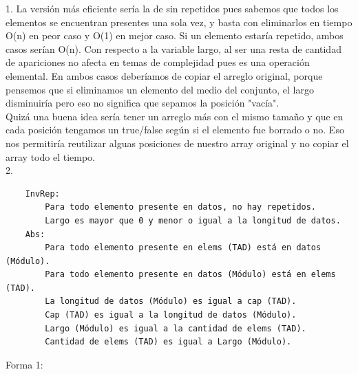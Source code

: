 \documentclass[10pt,a4paper]{article}
\begin{document}
1. La versión más eficiente sería la de sin repetidos pues sabemos que todos los elementos se encuentran presentes una sola vez, y basta con eliminarlos en tiempo O(n) en peor caso y O(1) en mejor caso. Si un elemento estaría repetido, ambos casos serían O(n). Con respecto a la variable largo, al ser una resta de cantidad de apariciones no afecta en temas de complejidad pues es una operación elemental. En ambos casos deberíamos de copiar el arreglo original, porque pensemos que si eliminamos un elemento del medio del conjunto, el largo disminuiría pero eso no significa que sepamos la posición "vacía". \\
Quizá una buena idea sería tener un arreglo más con el mismo tamaño y que en cada posición tengamos un true/false según si el elemento fue borrado o no. Eso nos permitiría reutilizar alguas posiciones de nuestro array original y no copiar el array todo el tiempo. \\
2.
\begin{lstlisting}
    InvRep: 
        Para todo elemento presente en datos, no hay repetidos.
        Largo es mayor que 0 y menor o igual a la longitud de datos.
    Abs: 
        Para todo elemento presente en elems (TAD) está en datos (Módulo).
        Para todo elemento presente en datos (Módulo) está en elems (TAD).
        La longitud de datos (Módulo) es igual a cap (TAD).
        Cap (TAD) es igual a la longitud de datos (Módulo).
        Largo (Módulo) es igual a la cantidad de elems (TAD).
        Cantidad de elems (TAD) es igual a Largo (Módulo).
\end{lstlisting}


Forma 1: \\
\end{document}
